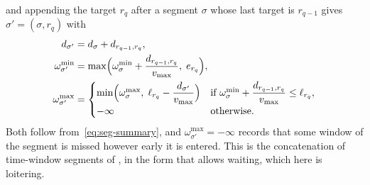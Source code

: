 \documentclass[11pt]{article}
\begin{document}
and appending the target $r_q$ after a segment $\sigma$ whose last target is $r_{q-1}$ gives $\sigma' = (\sigma, r_q)$ with
\begin{equation}\label{eq:seg-append}
\begin{aligned}
    d_{\sigma'} &= d_\sigma + d_{r_{q-1}, r_q}, \\
    \omega^{\min}_{\sigma'} &= \max\Bigl( \omega^{\min}_\sigma + \frac{d_{r_{q-1}, r_q}}{v_{\max}},\; e_{r_q} \Bigr), \\
    \omega^{\max}_{\sigma'} &= \begin{cases} \min\Bigl( \omega^{\max}_\sigma,\; \ell_{r_q} - \dfrac{d_{\sigma'}}{v_{\max}} \Bigr) & \text{if } \omega^{\min}_\sigma + \dfrac{d_{r_{q-1}, r_q}}{v_{\max}} \le \ell_{r_q}, \\[4pt] -\infty & \text{otherwise.} \end{cases}
\end{aligned}
\end{equation}
Both follow from~\eqref{eq:seg-summary}, and $\omega^{\max}_{\sigma'} = -\infty$ records that some window of the segment is missed however early it is entered. This is the concatenation of time-window segments of \citep{savelsbergh1992vehicle}, in the form that allows waiting, which here is loitering.
\end{document}
